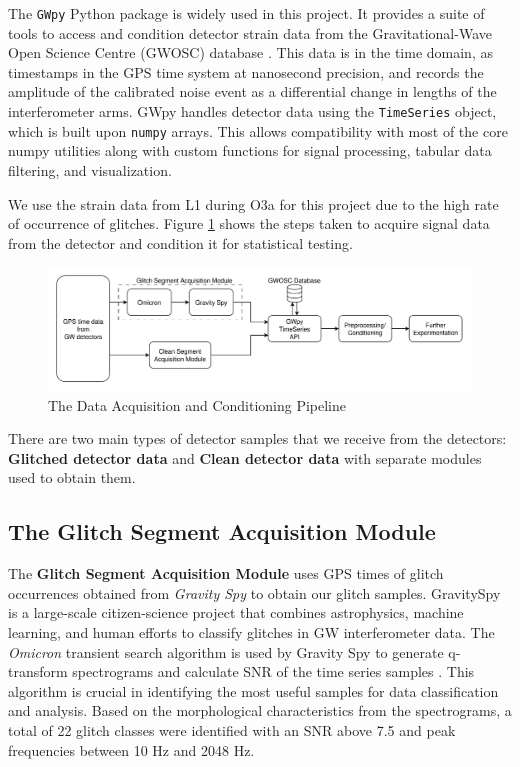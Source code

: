 \documentclass[12pt]{article}
\begin{document}
\noindent The \texttt{GWpy} Python package is widely used in this project. It provides a suite of tools to access and condition detector strain data from the Gravitational-Wave Open Science Centre (GWOSC) database \cite{gwpy}. This data is in the time domain, as timestamps in the GPS time system at nanosecond precision, and records the amplitude of the calibrated noise event as a differential change in lengths of the interferometer arms. GWpy handles detector data using the \texttt{TimeSeries} object, which is built upon \texttt{numpy} arrays. This allows compatibility with most of the core numpy utilities along with custom functions for signal processing, tabular data filtering, and visualization.

\medskip
\noindent We use the strain data from L1 during O3a for this project due to the high rate of occurrence of glitches. Figure \ref{fig:data_acq_cond} shows the steps taken to acquire signal data from the detector and condition it for statistical testing.

\begin{figure}[H]
    \centering
    \includegraphics[width=\textwidth]{images/data_acquisition_preparation.pdf}
    \caption{The Data Acquisition and Conditioning Pipeline}
    \label{fig:data_acq_cond}
\end{figure}

\medskip
\noindent There are two main types of detector samples that we receive from the detectors: \textbf{Glitched detector data} and \textbf{Clean detector data} with separate modules used to obtain them.
  
\subsection{The Glitch Segment Acquisition Module}\label{Glitchdata}

\medskip
\noindent The \textbf{Glitch Segment Acquisition Module} uses GPS times of glitch occurrences obtained from \textit{Gravity Spy} \cite{Zevin_2017} to obtain our glitch samples. GravitySpy is a large-scale citizen-science project that combines astrophysics, machine learning, and human efforts to classify glitches in GW interferometer data. The \textit{Omicron} transient search algorithm is used by Gravity Spy to generate q-transform spectrograms and calculate SNR of the time series samples \cite{robinet_omicron_2020}. This algorithm is crucial in identifying the most useful samples for data classification and analysis. Based on the morphological characteristics from the spectrograms, a total of 22 glitch classes were identified with an SNR above 7.5 and peak frequencies between 10 Hz and 2048 Hz.
\end{document}
